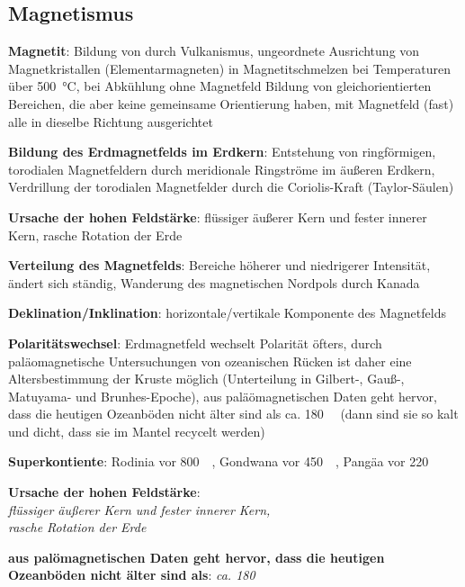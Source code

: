 \subsection{%
    Magnetismus%
}

\textbf{Magnetit}:
Bildung von  durch Vulkanismus,
ungeordnete Ausrichtung von Magnetkristallen (Elementarmagneten) in Magnetitschmelzen bei
Temperaturen über \SI{500}{\celsius},
bei Abkühlung ohne Magnetfeld Bildung von gleichorientierten Bereichen, die aber keine
gemeinsame Orientierung haben,
mit Magnetfeld (fast) alle in dieselbe Richtung ausgerichtet

\textbf{Bildung des Erdmagnetfelds im Erdkern}:
Entstehung von ringförmigen, torodialen Magnetfeldern durch meridionale Ringströme im
äußeren Erdkern,
Verdrillung der torodialen Magnetfelder durch die Coriolis-Kraft (Taylor-Säulen)

\textbf{Ursache der hohen Feldstärke}:
flüssiger äußerer Kern und fester innerer Kern,
rasche Rotation der Erde

\textbf{Verteilung des Magnetfelds}:
Bereiche höherer und niedrigerer Intensität,
ändert sich ständig,
Wanderung des magnetischen Nordpols durch Kanada

\textbf{Deklination/Inklination}:
horizontale/vertikale Komponente des Magnetfelds

\textbf{Polaritätswechsel}:
Erdmagnetfeld wechselt Polarität öfters,
durch paläomagnetische Untersuchungen von ozeanischen Rücken ist daher eine
Altersbestimmung der Kruste möglich
(Unterteilung in Gilbert-, Gauß-, Matuyama- und Brunhes-Epoche),
aus paläömagnetischen Daten geht hervor, dass die heutigen Ozeanböden nicht älter sind als
ca. \SI{180}{\mega\year}
(dann sind sie so kalt und dicht, dass sie im Mantel recycelt werden)

\textbf{Superkontiente}:
Rodinia vor \SI{800}{\mega\year},
Gondwana vor \SI{450}{\mega\year},
Pangäa vor \SI{220}{\mega\year}

\begin{wichtig}
    \item
    \textbf{Ursache der hohen Feldstärke}:\\
    \emph{flüssiger äußerer Kern und fester innerer Kern,\\
    rasche Rotation der Erde}

    \item
    \textbf{aus palömagnetischen Daten geht hervor, dass die heutigen Ozeanböden nicht
    älter sind als}:
    \emph{ca. \SI[math-rm=\mathit,text-rm=\itshape]{180}{\mega\year}}
\end{wichtig}

